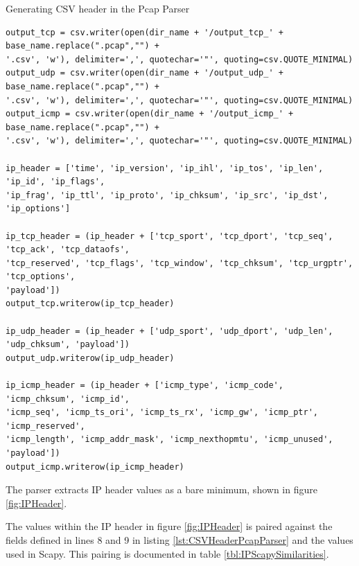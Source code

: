 \begin{listing}[!ht]
\caption{Generating CSV header in the Pcap Parser}
\label{lst:CSVHeaderPcapParser}
\begin{verbatim}
output_tcp = csv.writer(open(dir_name + '/output_tcp_' + base_name.replace(".pcap","") +
'.csv', 'w'), delimiter=',', quotechar='"', quoting=csv.QUOTE_MINIMAL)
output_udp = csv.writer(open(dir_name + '/output_udp_' + base_name.replace(".pcap","") + 
'.csv', 'w'), delimiter=',', quotechar='"', quoting=csv.QUOTE_MINIMAL)
output_icmp = csv.writer(open(dir_name + '/output_icmp_' + base_name.replace(".pcap","") + 
'.csv', 'w'), delimiter=',', quotechar='"', quoting=csv.QUOTE_MINIMAL)

ip_header = ['time', 'ip_version', 'ip_ihl', 'ip_tos', 'ip_len', 'ip_id', 'ip_flags', 
'ip_frag', 'ip_ttl', 'ip_proto', 'ip_chksum', 'ip_src', 'ip_dst', 'ip_options']

ip_tcp_header = (ip_header + ['tcp_sport', 'tcp_dport', 'tcp_seq', 'tcp_ack', 'tcp_dataofs', 
'tcp_reserved', 'tcp_flags', 'tcp_window', 'tcp_chksum', 'tcp_urgptr', 'tcp_options', 
'payload'])
output_tcp.writerow(ip_tcp_header)

ip_udp_header = (ip_header + ['udp_sport', 'udp_dport', 'udp_len', 'udp_chksum', 'payload'])
output_udp.writerow(ip_udp_header)

ip_icmp_header = (ip_header + ['icmp_type', 'icmp_code', 'icmp_chksum', 'icmp_id', 
'icmp_seq', 'icmp_ts_ori', 'icmp_ts_rx', 'icmp_gw', 'icmp_ptr', 'icmp_reserved', 
'icmp_length', 'icmp_addr_mask', 'icmp_nexthopmtu', 'icmp_unused', 'payload'])
output_icmp.writerow(ip_icmp_header)
\end{verbatim}
\end{listing}

The parser extracts IP header values as a bare minimum, shown in figure \ref{fig:IPHeader}.

The values within the IP header in figure \ref{fig:IPHeader} is paired against the fields defined in lines 8 and 9 in listing \ref{lst:CSVHeaderPcapParser} and the values used in Scapy.
This pairing is documented in table \ref{tbl:IPScapySimilarities}.

